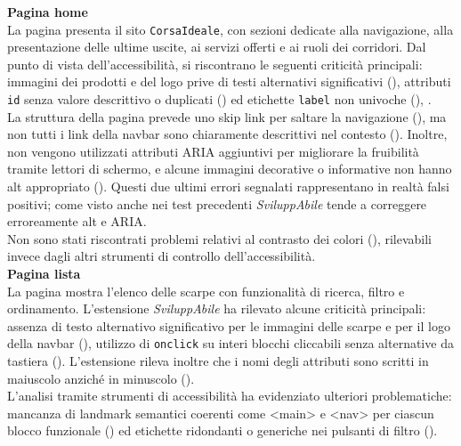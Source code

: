 \noindent \textbf{Pagina home}\\
La pagina presenta il sito \texttt{CorsaIdeale}, con sezioni dedicate alla navigazione, alla presentazione delle ultime uscite, ai servizi offerti e ai ruoli dei corridori. Dal punto di vista dell’accessibilità, si riscontrano le seguenti criticità principali: immagini dei prodotti e del logo prive di testi alternativi significativi ({}), attributi \texttt{id} senza valore descrittivo o duplicati ({}) ed etichette \texttt{label} non univoche ({}), .\\
La struttura della pagina prevede uno skip link per saltare la navigazione ({}), ma non tutti i link della navbar sono chiaramente descrittivi nel contesto ({}). Inoltre, non vengono utilizzati attributi ARIA aggiuntivi per migliorare la fruibilità tramite lettori di schermo, e alcune immagini decorative o informative non hanno alt appropriato ({}). Questi due ultimi errori segnalati rappresentano in realtà falsi positivi; come visto anche nei test precedenti \textit{SviluppAbile} tende a correggere erroreamente alt e ARIA.\\
Non sono stati riscontrati problemi relativi al contrasto dei colori ({}), rilevabili invece dagli altri strumenti di controllo dell'accessibilità.\\

\noindent \textbf{Pagina lista}\\ 
La pagina mostra l’elenco delle scarpe con funzionalità di ricerca, filtro e ordinamento. 
L’estensione \textit{SviluppAbile} ha rilevato alcune criticità principali: assenza di testo alternativo significativo per le immagini delle scarpe e per il logo della navbar ({}), utilizzo di \texttt{onclick} su interi blocchi cliccabili senza alternative da tastiera ({}). L'estensione rileva inoltre che i nomi degli attributi sono scritti in maiuscolo anziché in minuscolo ({}).\\
L’analisi tramite strumenti di accessibilità ha evidenziato ulteriori problematiche: mancanza di landmark semantici coerenti come <main> e <nav> per ciascun blocco funzionale ({}) ed etichette ridondanti o generiche nei pulsanti di filtro ({}).\\

